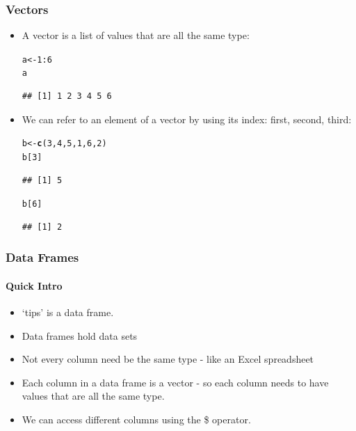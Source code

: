 \documentclass{beamer}\usepackage[]{graphicx}\usepackage[]{color}
\makeatletter
\newcommand{\hlnum}[1]{\textcolor[rgb]{0.686,0.059,0.569}{#1}}%
\newcommand{\hlopt}[1]{\textcolor[rgb]{0,0,0}{#1}}%
\newcommand{\hlstd}[1]{\textcolor[rgb]{0.345,0.345,0.345}{#1}}%
\newcommand{\hlkwb}[1]{\textcolor[rgb]{0.69,0.353,0.396}{#1}}%
\newcommand{\hlkwd}[1]{\textcolor[rgb]{0.737,0.353,0.396}{\textbf{#1}}}%
\newenvironment{kframe}{%
 \def\at@end@of@kframe{}%
 \ifinner\ifhmode%
  \def\at@end@of@kframe{\end{minipage}}%
  \begin{minipage}{\columnwidth}%
 \fi\fi%
 \def\FrameCommand##1{\hskip\@totalleftmargin \hskip-\fboxsep
 \colorbox{shadecolor}{##1}\hskip-\fboxsep
     \hskip-\linewidth \hskip-\@totalleftmargin \hskip\columnwidth}%
 \MakeFramed {\advance\hsize-\width
   \@totalleftmargin\z@ \linewidth\hsize
   \@setminipage}}%
 {\par\unskip\endMakeFramed%
 \at@end@of@kframe}
\newenvironment{knitrout}{}{} %
\makeatother
\begin{document}
\begin{frame}[fragile]
\frametitle{Vectors}
\begin{itemize}
  \item A vector is a list of values that are all the same type:
\begin{knitrout}\footnotesize
{}\color{fgcolor}\begin{kframe}
\begin{alltt}
\hlstd{a} \hlkwb{<-} \hlnum{1}\hlopt{:}\hlnum{6}
\hlstd{a}
\end{alltt}
\begin{verbatim}
## [1] 1 2 3 4 5 6
\end{verbatim}
\end{kframe}
\end{knitrout}

  \item We can refer to an element of a vector by using its index: first, second, third:
\begin{knitrout}\footnotesize
{}\color{fgcolor}\begin{kframe}
\begin{alltt}
\hlstd{b} \hlkwb{<-} \hlkwd{c}\hlstd{(}\hlnum{3}\hlstd{,} \hlnum{4}\hlstd{,} \hlnum{5}\hlstd{,} \hlnum{1}\hlstd{,} \hlnum{6}\hlstd{,} \hlnum{2}\hlstd{)}
\hlstd{b[}\hlnum{3}\hlstd{]}
\end{alltt}
\begin{verbatim}
## [1] 5
\end{verbatim}
\begin{alltt}
\hlstd{b[}\hlnum{6}\hlstd{]}
\end{alltt}
\begin{verbatim}
## [1] 2
\end{verbatim}
\end{kframe}
\end{knitrout}

\end{itemize}
\end{frame}

\begin{frame}[fragile]
    \frametitle{Data Frames}
    \framesubtitle{Quick Intro}
    \begin{itemize}
        \item `tips' is a data frame.
        \item Data frames hold data sets
        \item Not every column need be the same type - like an Excel spreadsheet
        \item Each column in a data frame is a vector - so each column needs to have values that are all the same type.
        \item We can access different columns using the \$ operator.
    \end{itemize}
\end{frame}
\end{document}
